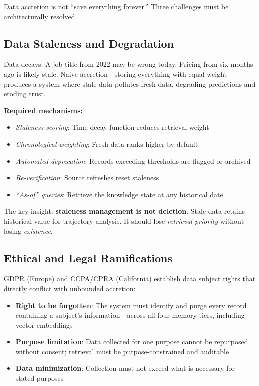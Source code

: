 \documentclass[11pt,twocolumn]{article}
\begin{document}
Data accretion is not ``save everything forever.'' Three challenges must be architecturally resolved.

\subsection{Data Staleness and Degradation}

Data decays. A job title from 2022 may be wrong today. Pricing from six months ago is likely stale. Naive accretion---storing everything with equal weight---produces a system where stale data pollutes fresh data, degrading predictions and eroding trust.

\textbf{Required mechanisms:}
\begin{itemize}[nosep,leftmargin=1.2em]
  \item \emph{Staleness scoring}: Time-decay function reduces retrieval weight
  \item \emph{Chronological weighting}: Fresh data ranks higher by default
  \item \emph{Automated deprecation}: Records exceeding thresholds are flagged or archived
  \item \emph{Re-verification}: Source refreshes reset staleness
  \item \emph{``As-of'' queries}: Retrieve the knowledge state at any historical date
\end{itemize}

The key insight: \textbf{staleness management is not deletion}. Stale data retains historical value for trajectory analysis. It should lose \emph{retrieval priority} without losing \emph{existence}.

\subsection{Ethical and Legal Ramifications}

GDPR (Europe) and CCPA/CPRA (California) establish data subject rights that directly conflict with unbounded accretion:

\begin{itemize}[nosep,leftmargin=1.2em]
  \item \textbf{Right to be forgotten}: The system must identify and purge every record containing a subject's information---across all four memory tiers, including vector embeddings
  \item \textbf{Purpose limitation}: Data collected for one purpose cannot be repurposed without consent; retrieval must be purpose-constrained and auditable
  \item \textbf{Data minimization}: Collection must not exceed what is necessary for stated purposes
\end{itemize}
\end{document}

